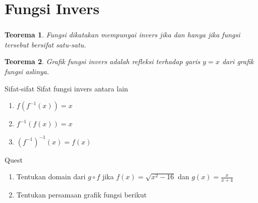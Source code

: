\documentclass[aspectratio=169]{beamer}
\newtheorem{teorema}{Teorema}
\theoremstyle{definition}
\begin{document}
    \section{Fungsi Invers}
    \begin{frame}
        \frametitle{\insertsection}
        \begin{teorema}
            Fungsi dikatakan mempunyai invers jika dan hanya jika fungsi tersebut bersifat satu-satu. 
        \end{teorema}
        \begin{teorema}
            Grafik fungsi invers adalah refleksi terhadap garis $y=x$ dari grafik fungsi aslinya.
        \end{teorema}
        \begin{block}{Sifat-sifat}
            Sifat fungsi invers antara lain
            \begin{enumerate}[label=(\arabic*)]
                \item $\displaystyle f(f^{-1}(x))=x$
                \item $\displaystyle f^{-1}(f(x))=x$
                \item $\displaystyle (f^{-1})^{-1}(x)=f(x)$
            \end{enumerate}
        \end{block}
    \end{frame}

    {
    \begin{frame}
        \begin{block}{\huge Quest}
            \begin{enumerate} [label=(\arabic*)]
                \item Tentukan domain dari $g\circ f$ jika $f(x)=\sqrt{x^2-16}$ dan $\displaystyle g(x)=\frac{x}{x+4}$
                \item Tentukan persamaan grafik fungsi berikut
            \end{enumerate}
        \end{block}
    \end{frame}}
\end{document}
